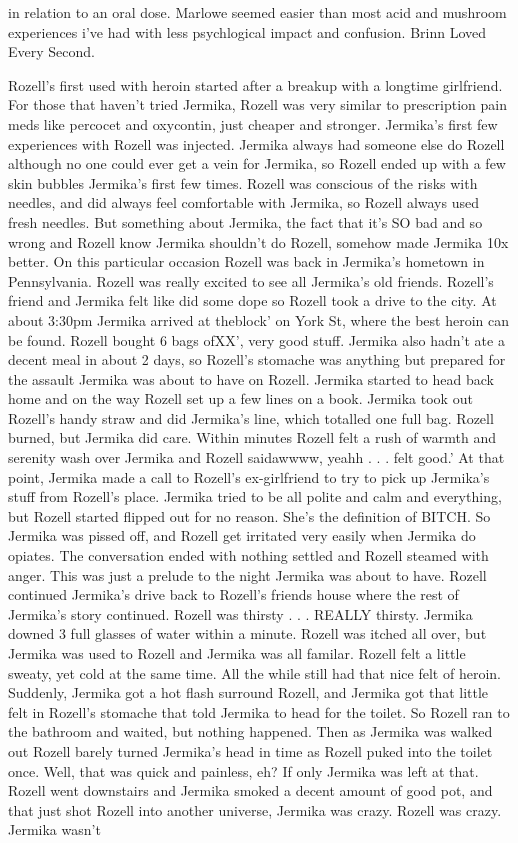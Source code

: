 \documentclass[12pt]{book}
\begin{document}
in relation to an oral dose. Marlowe seemed easier than most acid and mushroom experiences i've had with less psychlogical impact and confusion. Brinn Loved Every Second.



Rozell's first used with heroin started after a breakup with a longtime girlfriend. For those that haven't tried Jermika, Rozell was very similar to prescription pain meds like percocet and oxycontin, just cheaper and stronger. Jermika's first few experiences with Rozell was injected. Jermika always had someone else do Rozell although no one could ever get a vein for Jermika, so Rozell ended up with a few skin bubbles Jermika's first few times. Rozell was conscious of the risks with needles, and did always feel comfortable with Jermika, so Rozell always used fresh needles. But something about Jermika, the fact that it's SO bad and so wrong and Rozell know Jermika shouldn't do Rozell, somehow made Jermika 10x better. On this particular occasion Rozell was back in Jermika's hometown in Pennsylvania. Rozell was really excited to see all Jermika's old friends. Rozell's friend and Jermika felt like did some dope so Rozell took a drive to the city. At about 3:30pm Jermika arrived at theblock' on York St, where the best heroin can be found. Rozell bought 6 bags ofXX', very good stuff. Jermika also hadn't ate a decent meal in about 2 days, so Rozell's stomache was anything but prepared for the assault Jermika was about to have on Rozell. Jermika started to head back home and on the way Rozell set up a few lines on a book. Jermika took out Rozell's handy straw and did Jermika's line, which totalled one full bag. Rozell burned, but Jermika did care. Within minutes Rozell felt a rush of warmth and serenity wash over Jermika and Rozell saidawwww, yeahh . . .  felt good.' At that point, Jermika made a call to Rozell's ex-girlfriend to try to pick up Jermika's stuff from Rozell's place. Jermika tried to be all polite and calm and everything, but Rozell started flipped out for no reason. She's the definition of BITCH. So Jermika was pissed off, and Rozell get irritated very easily when Jermika do opiates. The conversation ended with nothing settled and Rozell steamed with anger. This was just a prelude to the night Jermika was about to have. Rozell continued Jermika's drive back to Rozell's friends house where the rest of Jermika's story continued. Rozell was thirsty . . .  REALLY thirsty. Jermika downed 3 full glasses of water within a minute. Rozell was itched all over, but Jermika was used to Rozell and Jermika was all familar. Rozell felt a little sweaty, yet cold at the same time. All the while still had that nice felt of heroin. Suddenly, Jermika got a hot flash surround Rozell, and Jermika got that little felt in Rozell's stomache that told Jermika to head for the toilet. So Rozell ran to the bathroom and waited, but nothing happened. Then as Jermika was walked out Rozell barely turned Jermika's head in time as Rozell puked into the toilet once. Well, that was quick and painless, eh? If only Jermika was left at that. Rozell went downstairs and Jermika smoked a decent amount of good pot, and that just shot Rozell into another universe, Jermika was crazy. Rozell was crazy. Jermika wasn't 
\end{document}
